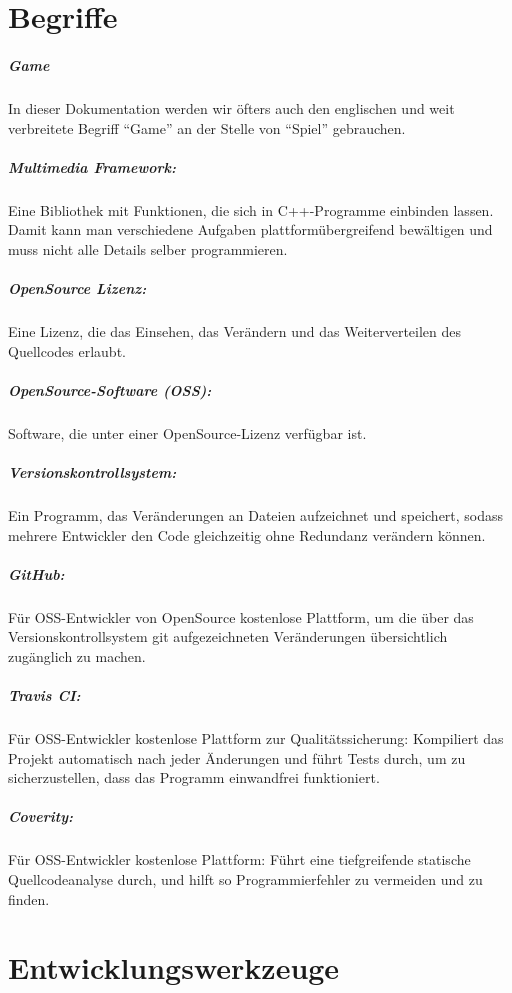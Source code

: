 \documentclass[12pt,a4paper]{scrartcl}
\newcommand{\q}[1]{``#1''}
\begin{document}
\newpage
\section{Begriffe}
\subparagraph{Game}
In dieser Dokumentation werden wir öfters auch den englischen und weit verbreitete Begriff \q{Game} an der Stelle von \q{Spiel} gebrauchen.

\subparagraph{Multimedia Framework:}
Eine Bibliothek mit Funktionen, die sich in C++-Programme einbinden lassen. Damit kann man verschiedene Aufgaben plattformübergreifend bewältigen und muss nicht alle Details selber programmieren.

\subparagraph{OpenSource Lizenz:}

Eine Lizenz, die das Einsehen, das Verändern und das Weiterverteilen des Quellcodes erlaubt.

\subparagraph{OpenSource-Software (OSS):}
Software, die unter einer OpenSource-Lizenz verfügbar ist.

\subparagraph{Versionskontrollsystem:}
Ein Programm, das Veränderungen an Dateien aufzeichnet und speichert, sodass mehrere Entwickler den Code gleichzeitig ohne Redundanz verändern können.

\subparagraph{GitHub:}
Für OSS-Entwickler von OpenSource kostenlose Plattform, um die über das Versionskontrollsystem git aufgezeichneten Veränderungen übersichtlich zugänglich zu machen.

\subparagraph{Travis CI:}
Für OSS-Entwickler kostenlose Plattform zur Qualitätssicherung: Kompiliert das Projekt automatisch nach jeder Änderungen und führt Tests durch, um zu sicherzustellen, dass das Programm einwandfrei funktioniert.

\subparagraph{Coverity:}
Für OSS-Entwickler kostenlose Plattform: Führt eine tiefgreifende statische Quellcodeanalyse durch, und hilft so Programmierfehler zu vermeiden und zu finden.

\section{Entwicklungswerkzeuge}
\end{document}
